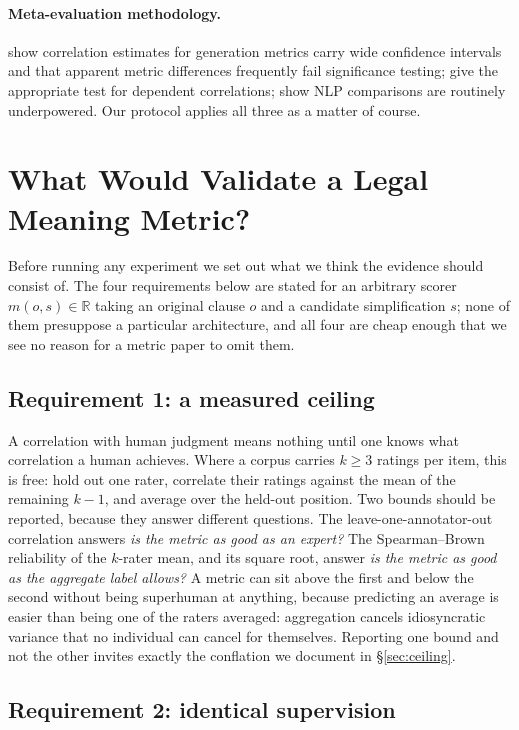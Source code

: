 \documentclass[11pt]{article}
\begin{document}
\paragraph{Meta-evaluation methodology.}
\citet{deutsch2021statistical} show correlation estimates for generation metrics
carry wide confidence intervals and that apparent metric differences frequently
fail significance testing; \citet{graham2014williams} give the appropriate test
for dependent correlations; \citet{card2020power} show NLP comparisons are
routinely underpowered. Our protocol applies all three as a matter of course.

\section{What Would Validate a Legal Meaning Metric?}
\label{sec:protocol}

Before running any experiment we set out what we think the evidence should
consist of. The four requirements below are stated for an arbitrary scorer
$m(o,s) \in \mathbb{R}$ taking an original clause $o$ and a candidate
simplification $s$; none of them presuppose a particular architecture, and all
four are cheap enough that we see no reason for a metric paper to omit them.

\subsection{Requirement 1: a measured ceiling}

A correlation with human judgment means nothing until one knows what correlation
a human achieves. Where a corpus carries $k \geq 3$ ratings per item, this is
free: hold out one rater, correlate their ratings against the mean of the
remaining $k-1$, and average over the held-out position. Two bounds should be
reported, because they answer different questions. The leave-one-annotator-out
correlation answers \emph{is the metric as good as an expert?} The
Spearman--Brown reliability of the $k$-rater mean, and its square root, answer
\emph{is the metric as good as the aggregate label allows?} A metric can sit
above the first and below the second without being superhuman at anything,
because predicting an average is easier than being one of the raters averaged:
aggregation cancels idiosyncratic variance that no individual can cancel for
themselves. Reporting one bound and not the other invites exactly the conflation
we document in \S\ref{sec:ceiling}.

\subsection{Requirement 2: identical supervision}
\end{document}
